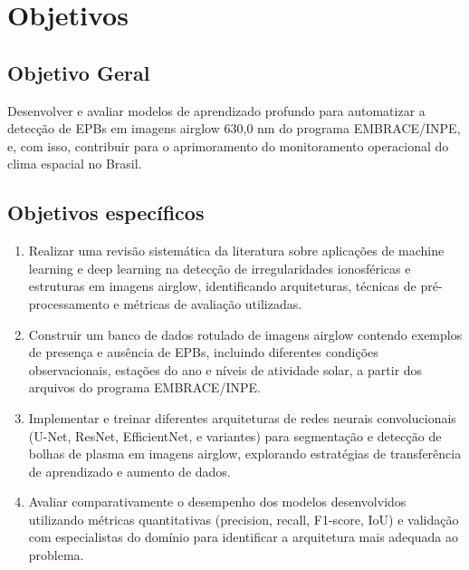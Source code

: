 \chapter{Objetivos}

\section{Objetivo Geral}

Desenvolver e avaliar modelos de aprendizado profundo para automatizar a detecção de EPBs em imagens airglow 630,0 nm do programa EMBRACE/INPE, e, com isso, contribuir para o aprimoramento do monitoramento operacional do clima espacial no Brasil.

\section{Objetivos específicos}

\begin{enumerate}
\item Realizar uma revisão sistemática da literatura sobre aplicações de machine learning e deep learning na detecção de irregularidades ionosféricas e estruturas em imagens airglow, identificando arquiteturas, técnicas de pré-processamento e métricas de avaliação utilizadas.

\item Construir um banco de dados rotulado de imagens airglow contendo exemplos de presença e ausência de EPBs, incluindo diferentes condições observacionais, estações do ano e níveis de atividade solar, a partir dos arquivos do programa EMBRACE/INPE.

\item Implementar e treinar diferentes arquiteturas de redes neurais convolucionais (U-Net, ResNet, EfficientNet, e variantes) para segmentação e detecção de bolhas de plasma em imagens airglow, explorando estratégias de transferência de aprendizado e aumento de dados.

\item Avaliar comparativamente o desempenho dos modelos desenvolvidos utilizando métricas quantitativas (precision, recall, F1-score, IoU) e validação com especialistas do domínio para identificar a arquitetura mais adequada ao problema.
\end{enumerate}